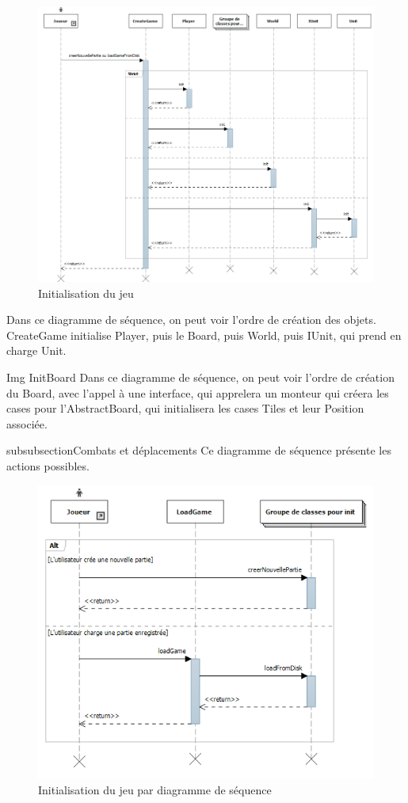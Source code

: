 \begin{figure}[!h]
\centering
\includegraphics[width=1\textwidth]{img/InitAll.png}
\caption{Initialisation du jeu}
\end{figure}

Dans ce diagramme de séquence, on peut voir l'ordre de création des objets. CreateGame initialise Player, puis le Board, puis World, puis IUnit, qui prend en charge Unit.

Img InitBoard
Dans ce diagramme de séquence, on peut voir l'ordre de création du Board, avec l'appel à une interface, qui apprelera un monteur qui créera les cases pour l'AbstractBoard, qui initialisera les cases Tiles et leur Position associée.

subsubsection{Combats et déplacements}
Ce diagramme de séquence présente les actions possibles. 

\begin{figure}[!h]
\centering
\includegraphics[width=1\textwidth]{img/LoadInitDiagram.png}
\caption{Initialisation du jeu par diagramme de séquence}
\end{figure}

